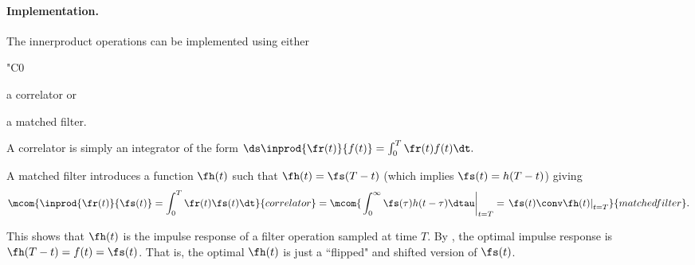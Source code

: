 \paragraph{Implementation.}
The innerproduct operations can be implemented using either
  \begin{dingautolist}{"C0}
     \item a correlator or
     \item a matched filter.
  \end{dingautolist}

A correlator is simply an integrator of the form
   $\ds\inprod{\fr(t)}{f(t)} = \int_0^T \fr(t)f(t)\dt.$

A matched filter introduces a function $\fh(t)$ such that
$\fh(t) =\fs(T-t)$ (which implies $\fs(t)=h(T-t)$) giving
  \[
    \mcom{\inprod{\fr(t)}{\fs(t)} = \int_0^T \fr(t)\fs(t)\dt }
         {correlator}
    =
    \mcom{\left.\int_0^\infty \fs(\tau)h(t-\tau)\dtau\right|_{t=T}
            = \left.\fs(t)\conv \fh(t)\right|_{t=T}
         }{matched filter}.
  \]

This shows that $\fh(t)$ is the impulse response of a filter operation
sampled at time $T$. %
By , the optimal impulse response is
$\fh(T-t)=f(t)=\fs(t)$.
That is, the optimal $\fh(t)$ is just a ``flipped" and shifted version of $\fs(t)$.

%
%



